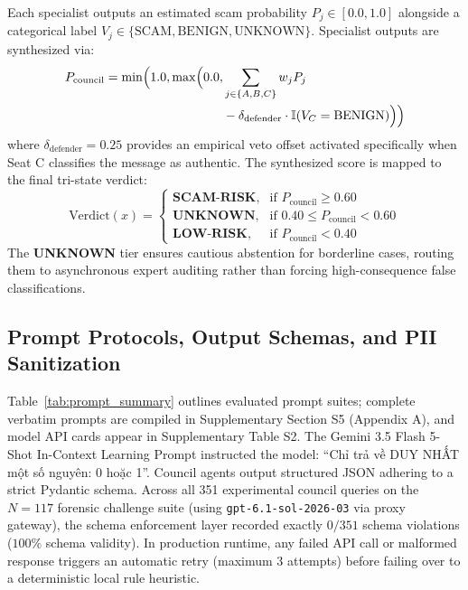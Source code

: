 \documentclass[journal]{IEEEtran}
\begin{document}
Each specialist outputs an estimated scam probability $P_j \in [0.0, 1.0]$ alongside a categorical label $V_j \in \{\text{SCAM}, \text{BENIGN}, \text{UNKNOWN}\}$. Specialist outputs are synthesized via:
\begin{equation}
\label{eq:council_aggregation}
\begin{split}
P_{\text{council}} = \min\Bigl(1.0, \max\Bigl(0.0, &\sum_{j \in \{A, B, C\}} w_j P_j \\
&- \delta_{\text{defender}} \cdot \mathbb{I}(V_C = \text{BENIGN})\Bigr)\Bigr)
\end{split}
\end{equation}
where $\delta_{\text{defender}} = 0.25$ provides an empirical veto offset activated specifically when Seat C classifies the message as authentic. The synthesized score is mapped to the final tri-state verdict:
\begin{equation}
\label{eq:verdict}
\text{Verdict}(x) = \begin{cases}
\textbf{SCAM-RISK}, & \text{if } P_{\text{council}} \ge 0.60 \\
\textbf{UNKNOWN},   & \text{if } 0.40 \le P_{\text{council}} < 0.60 \\
\textbf{LOW-RISK},  & \text{if } P_{\text{council}} < 0.40
\end{cases}
\end{equation}
The \textbf{UNKNOWN} tier ensures cautious abstention for borderline cases, routing them to asynchronous expert auditing rather than forcing high-consequence false classifications.

\subsection{Prompt Protocols, Output Schemas, and PII Sanitization}
\label{subsec:prompts_pii}

Table~\ref{tab:prompt_summary} outlines evaluated prompt suites; complete verbatim prompts are compiled in Supplementary Section S5 (Appendix A), and model API cards appear in Supplementary Table S2. The Gemini 3.5 Flash 5-Shot In-Context Learning Prompt instructed the model: ``Chỉ trả về DUY NHẤT một số nguyên: 0 hoặc 1''. Council agents output structured JSON adhering to a strict Pydantic schema. Across all 351 experimental council queries on the $N=117$ forensic challenge suite (using \texttt{gpt-6.1-sol-2026-03} via proxy gateway), the schema enforcement layer recorded exactly $0/351$ schema violations ($100\%$ schema validity). In production runtime, any failed API call or malformed response triggers an automatic retry (maximum 3 attempts) before failing over to a deterministic local rule heuristic.
\end{document}
